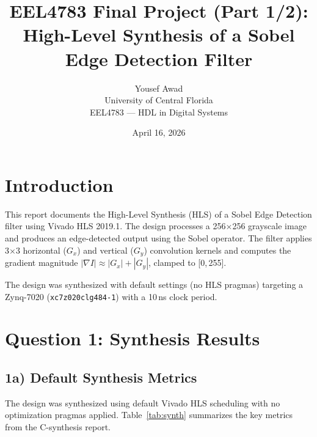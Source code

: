 \documentclass[11pt,letterpaper]{article}
\title{\textbf{EEL4783 Final Project (Part 1/2):\\High-Level Synthesis of a Sobel Edge Detection Filter}}
\author{
  Yousef Awad \\
  University of Central Florida \\
  EEL4783 --- HDL in Digital Systems
}
\date{April 16, 2026}
\begin{document}
\maketitle
\thispagestyle{fancy}

\section*{Introduction}

This report documents the High-Level Synthesis (HLS) of a Sobel Edge Detection filter using Vivado HLS 2019.1.
The design processes a 256$\times$256 grayscale image and produces an edge-detected output using the Sobel operator.
The filter applies 3$\times$3 horizontal ($G_x$) and vertical ($G_y$) convolution kernels and computes the gradient
magnitude $|\nabla I| \approx |G_x| + |G_y|$, clamped to [0,\,255].

The design was synthesized with default settings (no HLS pragmas) targeting a Zynq-7020
(\texttt{xc7z020clg484-1}) with a 10\,ns clock period.

\section{Question 1: Synthesis Results}

\subsection{1a) Default Synthesis Metrics}

The design was synthesized using default Vivado HLS scheduling with no optimization pragmas applied.
Table~\ref{tab:synth} summarizes the key metrics from the C-synthesis report.
\end{document}

